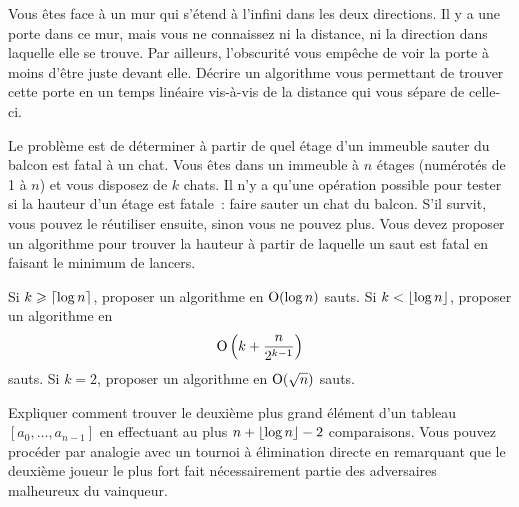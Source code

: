 \documentclass{magnoliaold}
\begin{document}


Vous êtes face à un mur qui s'étend à l'infini dans les deux directions. Il y a une porte dans ce mur, mais vous ne connaissez ni la distance, ni la direction dans laquelle elle se trouve. Par ailleurs, l'obscurité vous empêche de voir la porte à moins d'être juste devant elle.
Décrire un algorithme vous permettant de trouver cette porte en un temps linéaire vis-à-vis de la distance qui vous sépare de celle-ci.

Le problème est de déterminer à partir de quel étage d'un immeuble sauter du balcon est
fatal à un chat. Vous êtes dans un immeuble à $n$ étages (numérotés de 1 à $n$) et vous disposez de $k$ chats. Il n'y a qu'une opération possible pour tester si la hauteur d'un étage est fatale~: faire sauter un chat du balcon. S'il survit, vous pouvez le réutiliser ensuite, sinon vous ne pouvez plus. Vous devez proposer un algorithme pour trouver la hauteur à partir de laquelle un saut est fatal en faisant le minimum de lancers.
\begin{questions}
\question Si $k\geqslant \left\lceil\log n\right\rceil$, proposer un algorithme en ${\rm O}(\log n)$ sauts.
\question Si $k<\left\lfloor\log n\right\rfloor$, proposer un algorithme en
  \[{\rm O}\left(k+\frac{n}{2^{k-1}}\right)\]
  sauts.
\question Si $k=2$, proposer un algorithme en ${\rm O}(\sqrt{n})$ sauts.
\end{questions}

Expliquer comment trouver le deuxième plus grand élément d'un tableau $[a_0,\ldots,a_{n-1}]$
en effectuant au plus $n+\left\lfloor\log n\right\rfloor-2$ comparaisons. Vous pouvez procéder par analogie avec
un tournoi à élimination directe en remarquant que le deuxième joueur le plus fort fait
nécessairement partie des adversaires malheureux du vainqueur.
\end{document}
